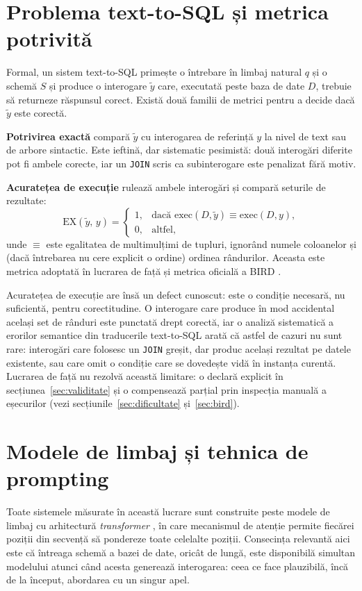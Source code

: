 \documentclass[12pt,a4paper]{report}
\newcommand{\code}[1]{\texttt{\small #1}}
\begin{document}
\section{Problema text-to-SQL și metrica potrivită}

Formal, un sistem text-to-SQL primește o întrebare în limbaj natural $q$ și
o schemă $S$ și produce o interogare $\tilde{y}$ care, executată peste baza de
date $D$, trebuie să returneze răspunsul corect. Există două familii de
metrici pentru a decide dacă $\tilde{y}$ este corectă.

\textbf{Potrivirea exactă} compară $\tilde{y}$ cu interogarea de referință $y$
la nivel de text sau de arbore sintactic. Este ieftină, dar
sistematic pesimistă: două interogări diferite pot fi ambele corecte, iar
un \code{JOIN} scris ca subinterogare este penalizat fără motiv.

\textbf{Acuratețea de execuție} rulează ambele interogări și compară
seturile de rezultate:
\[
  \mathrm{EX}(\tilde{y},\, y) =
  \begin{cases}
    1, & \text{dacă } \mathrm{exec}(D, \tilde{y}) \equiv \mathrm{exec}(D, y),\\[2pt]
    0, & \text{altfel,}
  \end{cases}
\]
unde $\equiv$ este egalitatea de multimulțimi de tupluri, ignorând numele
coloanelor și (dacă întrebarea nu cere explicit o ordine) ordinea
rândurilor. Aceasta este metrica adoptată în lucrarea de față și metrica
oficială a BIRD \cite{bird}.

Acuratețea de execuție are însă un defect cunoscut: este o condiție
necesară, nu suficientă, pentru corectitudine. O interogare care produce în mod
accidental același set de rânduri este punctată drept corectă, iar o analiză
sistematică a erorilor semantice din traducerile text-to-SQL
\cite{nl2sqlbugs} arată că astfel de cazuri nu sunt rare: interogări care
folosesc un \code{JOIN} greșit, dar produc același rezultat pe datele
existente, sau care omit o condiție care se dovedește vidă în instanța
curentă. Lucrarea de față nu rezolvă această limitare: o declară explicit
în secțiunea~\ref{sec:validitate} și o compensează parțial prin inspecția manuală a
eșecurilor (vezi secțiunile~\ref{sec:dificultate} și~\ref{sec:bird}).

\section{Modele de limbaj și tehnica de prompting}

Toate sistemele măsurate în această lucrare sunt construite peste modele de
limbaj cu arhitectură \emph{transformer} \cite{transformer}, în care
mecanismul de atenție permite fiecărei poziții din secvență să pondereze
toate celelalte poziții. Consecința relevantă aici este că întreaga schemă a
bazei de date, oricât de lungă, este disponibilă simultan modelului atunci
când acesta generează interogarea: ceea ce face plauzibilă, încă de la
început, abordarea cu un singur apel.
\end{document}
